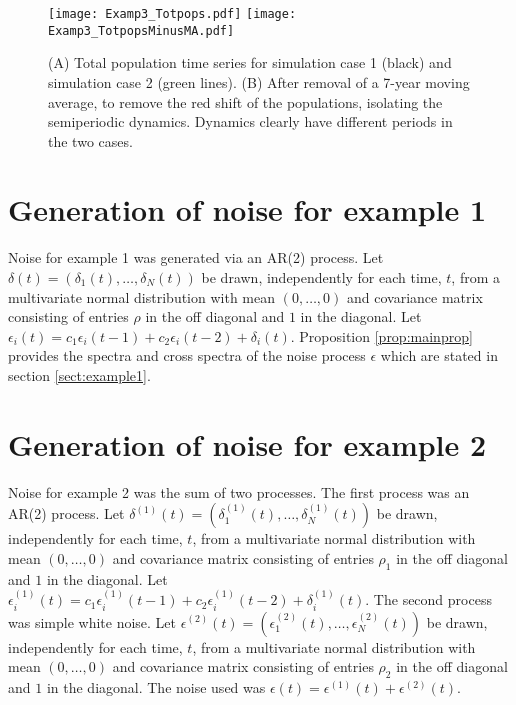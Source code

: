 \documentclass[letterpaper,11pt]{article}
\begin{document}
\begin{figure}
\texttt{[image: Examp3\_Totpops.pdf]}
\texttt{[image: Examp3\_TotpopsMinusMA.pdf]}
\caption{(A) Total population time series for simulation case 1 (black) and simulation case 2 (green lines). (B) After removal of a 7-year moving average, to remove the red
shift of the populations, isolating the semiperiodic dynamics. Dynamics clearly have different periods in the two cases. }\label{fig:example3_popts}
\end{figure}

\section{Generation of noise for example 1}\label{sec:noise1}

Noise for example 1 was generated via an AR(2) process. Let 
$\delta(t) = (\delta_1(t),\ldots,\delta_N(t))$ be drawn, independently for 
each time, $t$, from a multivariate normal distribution with mean $(0,\ldots,0)$
and covariance matrix consisting of entries $\rho$ in the off diagonal and $1$
in the diagonal. Let $\epsilon_i(t)=c_1 \epsilon_i(t-1) + c_2 \epsilon_i(t-2)+\delta_i(t)$. Proposition \ref{prop:mainprop} provides the spectra
and cross spectra of the noise process $\epsilon$ which are stated in section
\ref{sect:example1}.

\section{Generation of noise for example 2}\label{sec:noise2}

Noise for example 2 was the sum of two processes. The first process was an 
AR(2) process. Let $\delta^{(1)}(t) = (\delta^{(1)}_1(t),\ldots,\delta^{(1)}_N(t))$ be drawn, independently for each time, $t$, from a multivariate normal distribution with mean $(0,\ldots,0)$
and covariance matrix consisting of entries $\rho_1$ in the off diagonal and $1$
in the diagonal. Let $\epsilon^{(1)}_i(t)=c_1 \epsilon^{(1)}_i(t-1) + c_2 \epsilon^{(1)}_i(t-2)+\delta^{(1)}_i(t)$. The second process was simple white noise.
Let $\epsilon^{(2)}(t) = (\epsilon^{(2)}_1(t),\ldots,\epsilon^{(2)}_N(t))$ be drawn, independently for each time, $t$, from a multivariate normal distribution with mean $(0,\ldots,0)$
and covariance matrix consisting of entries $\rho_2$ in the off diagonal and $1$
in the diagonal. The noise used was $\epsilon(t)=\epsilon^{(1)}(t)+\epsilon^{(2)}(t)$.
\end{document}
